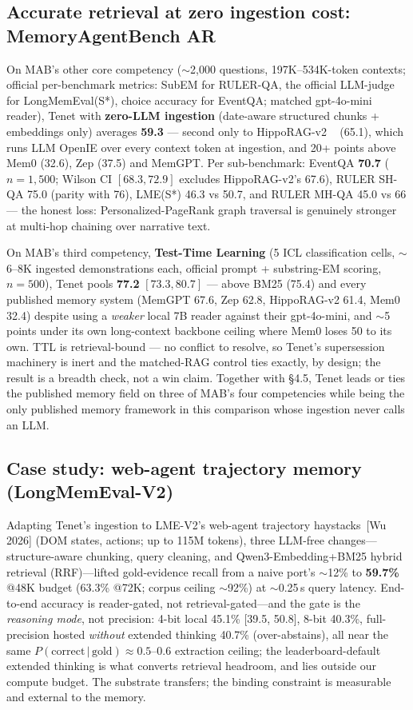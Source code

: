 \documentclass[11pt]{article}
\begin{document}
\subsection{Accurate retrieval at zero ingestion cost: MemoryAgentBench AR}
On MAB's other core competency ($\sim$2{,}000 questions, 197K--534K-token contexts;
official per-benchmark metrics: SubEM for RULER-QA, the official LLM-judge for
LongMemEval(S*), choice accuracy for EventQA; matched gpt-4o-mini reader), Tenet with
\textbf{zero-LLM ingestion} (date-aware structured chunks + embeddings only) averages
\textbf{59.3} --- second only to HippoRAG-v2 ~\cite{hipporag2} (65.1), which runs LLM
OpenIE over every context token at ingestion, and 20+ points above Mem0 (32.6),
Zep (37.5) and MemGPT. Per sub-benchmark: EventQA \textbf{70.7} ($n{=}1{,}500$; Wilson CI
$[68.3, 72.9]$ excludes HippoRAG-v2's 67.6), RULER SH-QA 75.0 (parity with 76),
LME(S*) 46.3 vs 50.7, and RULER MH-QA 45.0 vs 66 --- the honest loss:
Personalized-PageRank graph traversal is genuinely stronger at multi-hop chaining over
narrative text.

On MAB's third competency, \textbf{Test-Time Learning} (5 ICL classification cells,
$\sim$6--8K ingested demonstrations each, official prompt + substring-EM scoring,
$n{=}500$), Tenet pools \textbf{77.2} $[73.3, 80.7]$ --- above BM25 (75.4) and every
published memory system (MemGPT 67.6, Zep 62.8, HippoRAG-v2 61.4, Mem0 32.4) despite
using a \emph{weaker} local 7B reader against their gpt-4o-mini, and $\sim$5 points
under its own long-context backbone ceiling where Mem0 loses 50 to its own. TTL is
retrieval-bound --- no conflict to resolve, so Tenet's supersession machinery is inert
and the matched-RAG control ties exactly, by design; the result is a breadth check, not
a win claim. Together with \S4.5, Tenet leads or ties the published memory field on
three of MAB's four competencies while being the only published memory framework in
this comparison whose ingestion never calls an LLM.

\subsection{Case study: web-agent trajectory memory (LongMemEval-V2)}
Adapting Tenet's ingestion to LME-V2's web-agent trajectory haystacks~[Wu 2026] (DOM
states, actions; up to 115M tokens), three LLM-free changes---structure-aware chunking,
query cleaning, and Qwen3-Embedding{+}BM25 hybrid retrieval (RRF)---lifted gold-evidence
recall from a naive port's $\sim$12\% to \textbf{59.7\%} @48K budget (63.3\% @72K;
corpus ceiling $\sim$92\%) at $\sim$0.25\,s query latency. End-to-end accuracy is
reader-gated, not retrieval-gated---and the gate is the \emph{reasoning mode}, not
precision: 4-bit local 45.1\% [39.5, 50.8], 8-bit 40.3\%, full-precision hosted
\emph{without} extended thinking 40.7\% (over-abstains), all near the same
$P(\text{correct}\,|\,\text{gold})\approx0.5$--$0.6$ extraction ceiling; the
leaderboard-default extended thinking is what converts retrieval headroom, and lies
outside our compute budget. The substrate transfers; the binding constraint is
measurable and external to the memory.
\end{document}
